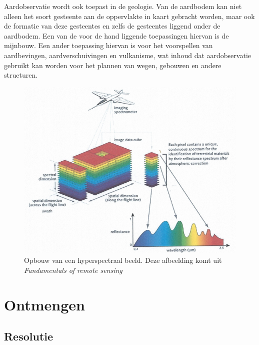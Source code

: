 \documentclass[12pt]{report}
\begin{document}
Aardobservatie wordt ook toepast in de geologie. Van de aardbodem kan niet alleen het soort gesteente aan de oppervlakte in kaart gebracht worden, maar ook de formatie van deze gesteentes en zelfs de gesteentes liggend onder de aardbodem. Een van de voor de hand liggende toepassingen hiervan is de mijnbouw. Een ander toepassing hiervan is voor het voorspellen van aardbevingen, aardverschuivingen en vulkanisme, wat inhoud dat aardobservatie gebruikt kan worden voor het plannen van wegen, gebouwen en andere structuren. 

  
\begin{figure}
\includegraphics[width=\textwidth]{hyp.PNG}
\caption{Opbouw van een hyperspectraal beeld. Deze afbeelding komt uit \textit{Fundamentals of remote sensing\cite{fun}}}
\end{figure}

\chapter{Ontmengen}




\section{Resolutie}
\end{document}
